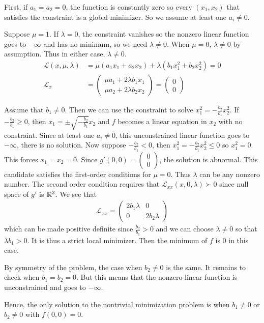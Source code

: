 \documentclass[12pt]{article}
\begin{document}
\begin{problem}[4]
First, if $ a_1=a_2=0$, the function is constantly zero so every $ (x_1,x_2)$ that satisfies the constraint is a global minimizer. So we assume at least one $ a_i \neq 0$.

Suppose $ \mu=1$. If $ \lambda =0$, the constraint vanishes so the nonzero linear function goes to $ -\infty$ and has no minimum, so we need $ \lambda\neq 0$. When $ \mu=0$, $ \lambda \neq 0$ by assumption. Thus in either case, $ \lambda \neq 0$.
\begin{align*}
	\mathscr{L}(x,\mu,\lambda) &= \mu(a_1x_1+a_2x_2)+ \lambda(b_1x_1^2+b_2x_2^2) =0\\
	\mathscr{L}_x&= \begin{pmatrix} \mu a_1+2\lambda b_1 x_1\\ \mu a_2+2 \lambda b_2 x_2\end{pmatrix} = \begin{pmatrix} 0\\0 \end{pmatrix}  
\end{align*}

Assume that $ b_1 \neq 0$. Then we can use the constraint to solve $ x_1^2 =- \frac{b_2}{ b_1} x_2^2 $. If $ -\frac{b_2}{ b_1} \geq 0$, then $ x_1 = \pm\sqrt{-\frac{b_2}{ b_1}} x_2$ and $ f$ becomes a linear equation in  $ x_2$ with no constraint. Since at least one $ a_i \neq 0$, this unconstrained linear function goes to $ -\infty$, there is no solution. Now suppose $ -\frac{b_2}{b_1}<0$, then $ x_1^2 = -\frac{b_2}{b_1} x_2^2 \leq 0$ so $ x_1^2 =0$. This forces $ x_1=x_2=0$. Since $ g'(0,0) = \begin{pmatrix} 0\\0 \end{pmatrix} $, the solution is abnormal. This candidate satisfies the first-order conditions for $ \mu=0$. Thus $ \lambda$ can be any nonzero number. The second order condition requires that $ \mathscr{L}_{x x}(x,0,\lambda) \succ 0$ since null space of  $ g'$ is  $ \mathbb{R}^2$. We see that
\begin{align*}
	\mathscr{L}_{x x} = \begin{pmatrix} 2b_1 \lambda&0\\0& 2b_2 \lambda \end{pmatrix} 
\end{align*}
which can be made positive definite since $ \frac{b_2}{b_1} >0$ and we can choose $ \lambda \neq 0$ so that $ \lambda b_1 >0$. It is thus a strict local minimizer. Then the minimum of $ f$ is 0 in this case.

By symmetry of the problem, the case when $ b_2\neq 0$ is the same. It remains to check when $ b_1 =b_2=0$. But this means that the nonzero linear function is unconstrained and goes to $ -\infty$.

Hence, the only solution to the nontrivial minimization problem is when $ b_1 \neq 0$ or $ b_2 \neq 0$ with $ f(0,0)=0$.
\end{problem}
\end{document}
